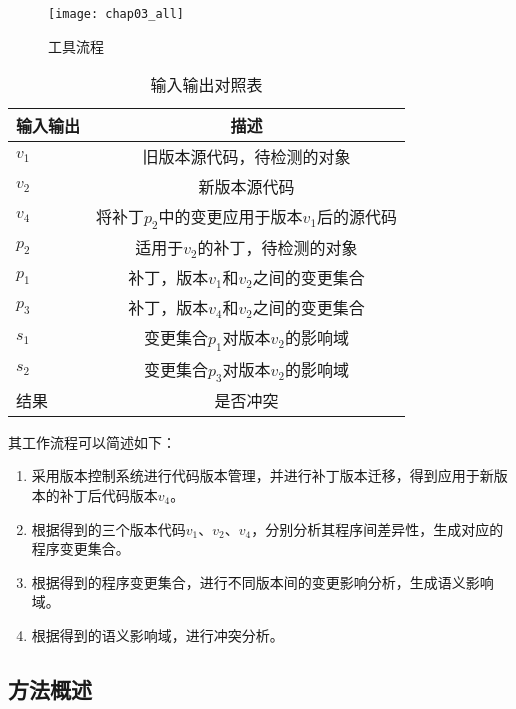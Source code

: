 \begin{figure}[H]
	\centering
	\texttt{[image: chap03\_all]}
	\caption {工具流程}
	\label {solution_all}	
\end{figure}

\begin{table}[H]
	\caption{输入输出对照表}
	\label{all_io2}
	\centering
	\begin{tabular}{lc}
		\toprule[1.5pt]
		{\heiti 输入输出} & {\heiti 描述}\\\midrule[1pt]
		$v_1$ & 旧版本源代码，待检测的对象 \\
		$v_2$ & 新版本源代码 \\
		$v_4$ & 将补丁$p_2$中的变更应用于版本$v_1$后的源代码 \\
		$p_2$ & 适用于$v_2$的补丁，待检测的对象 \\
		$p_1$ & 补丁，版本$v_1$和$v_2$之间的变更集合\\
		$p_3$ & 补丁，版本$v_4$和$v_2$之间的变更集合\\
		$s_1$ & 变更集合$p_1$对版本$v_2$的影响域 \\
		$s_2$ & 变更集合$p_3$对版本$v_2$的影响域 \\
		结果 & 是否冲突\\
		\bottomrule[1.5pt]
	\end{tabular}
\end{table}

其工作流程可以简述如下：

\begin{enumerate}
	\item 采用版本控制系统进行代码版本管理，并进行补丁版本迁移，得到应用于新版本的补丁后代码版本$v_4$。
	\item 根据得到的三个版本代码$v_1$、$v_2$、$v_4$，分别分析其程序间差异性，生成对应的程序变更集合。
	\item 根据得到的程序变更集合，进行不同版本间的变更影响分析，生成语义影响域。
	\item 根据得到的语义影响域，进行冲突分析。
\end{enumerate}

\subsection{方法概述}


